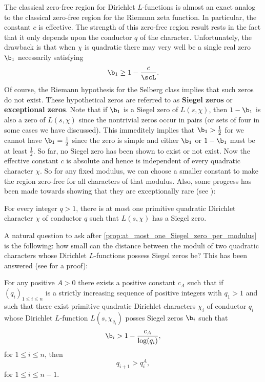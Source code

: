       The classical zero-free region for Dirichlet $L$-functions is almost an exact analog to the classical zero-free region for the Riemann zeta function. In particular, the constant $c$ is effective. The strength of this zero-free region result rests in the fact that it only depends upon the conductor $q$ of the character. Unfortunately, the drawback is that when $\chi$ is quadratic there may very well be a single real zero $\b_{1}$ necessarily satisfying 
      \[
        \b_{1} \ge 1-\frac{c}{\scL}.
      \]
      Of course, the Riemann hypothesis for the Selberg class implies that such zeros do not exist. These hypothetical zeros are referred to as \textbf{Siegel zeros} or \textbf{exceptional zeros}. Note that if $\b_{1}$ is a Siegel zero of $L(s,\chi)$, then $1-\b_{1}$ is also a zero of $L(s,\chi)$ since the nontrivial zeros occur in pairs (or sets of four in some cases we have discussed). This immeditely implies that $\b_{1} > \frac{1}{2}$ for we cannot have $\b_{1} = \frac{1}{2}$ since the zero is simple and either $\b_{1}$ or $1-\b_{1}$ must be at least $\frac{1}{2}$. So far, no Siegel zero has been shown to exist or not exist. Now the effective constant $c$ is absolute and hence is independent of every quadratic character $\chi$. So for any fixed modulus, we can choose a smaller constant to make the region zero-free for all characters of that modulus. Also, some progress has been made towards showing that they are exceptionally rare (see \cite{montgomery2006multiplicative}):

      \begin{proposition}\label{prop:at_most_one_Siegel_zero_per_modulus}
        For every integer $q > 1$, there is at most one primitive quadratic Dirichlet character $\chi$ of conductor $q$ such that $L(s,\chi)$ has a Siegel zero.
      \end{proposition}

      A natural question to ask after \cref{prop:at_most_one_Siegel_zero_per_modulus} is the following: how small can the distance between the moduli of two quadratic characters whose Dirichlet $L$-functions possess Siegel zeros be? This has been answered (see \cite{montgomery2006multiplicative} for a proof):

      \begin{proposition}\label{prop:modulus_distance_Siegel_zeros}
        For any positive $A > 0$ there exists a positive constant $c_{A}$ such that if $(q_{i})_{1 \le i \le n}$ is a strictly increasing sequence of positive integers with $q_{1} > 1$ and such that there exist primitive quadratic Dirichlet characters $\chi_{i}$ of conductor $q_{i}$ whose Dirichlet $L$-function $L(s,\chi_{q_{i}})$ posses Siegel zeros $\b_{i}$ such that
        \[
          \b_{i} > 1-\frac{c_{A}}{\log(q_{i})},
        \]
        for $1 \le i \le n$, then
        \[
          q_{i+1} > q_{i}^{A},
        \]
        for $1 \le i \le n-1$.
      \end{proposition}
